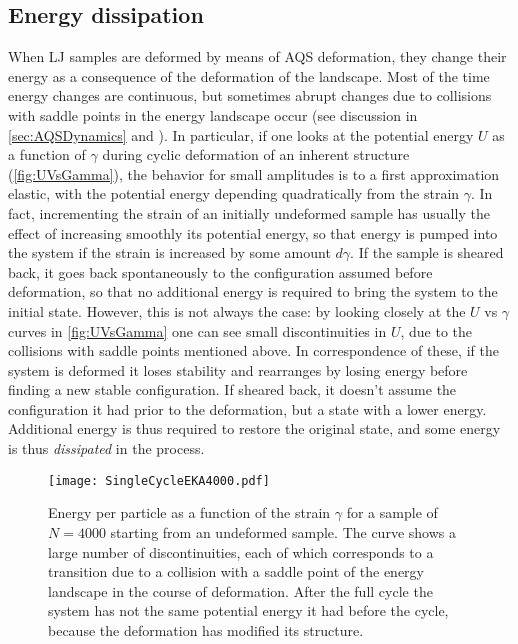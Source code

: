 \subsection{Energy dissipation\label{sec:DissipationBehavior}}

When LJ samples are deformed by means of AQS deformation, they change their energy as a consequence of the deformation of the landscape. Most of the time energy changes are continuous, but sometimes abrupt changes due to collisions with saddle points in the energy landscape occur (see discussion in \autoref{sec:AQSDynamics} and \cite{maloney2006amorphous}). In particular, if one looks at the potential energy $U$ as a function of $\gamma$ during cyclic deformation of an inherent structure (\autoref{fig:UVsGamma}), the behavior for small amplitudes is to a first approximation elastic, with the potential energy depending quadratically from the strain $\gamma$. In fact, incrementing the strain of an initially undeformed sample has usually the effect of increasing smoothly its potential energy, so that energy is pumped into the system if the strain is increased by some amount $d\gamma$. If the sample is sheared back, it goes back spontaneously to the configuration assumed before deformation, so that no additional energy is required to bring the system to the initial state.
However, this is not always the case: by looking closely at the $U$ vs $\gamma$ curves in \autoref{fig:UVsGamma} one can see small discontinuities in $U$, due to the collisions with saddle points mentioned above. In correspondence of these, if the system is deformed it loses stability and rearranges by losing energy before finding a new stable configuration. If sheared back, it doesn't assume the configuration it had prior to the deformation, but a state with a lower energy. Additional energy is thus required to restore the original state, and some energy is thus \emph{dissipated} in the process. 

\begin{figure}[!h] 
\centering 
\texttt{[image: SingleCycleEKA4000.pdf]} 
\caption{Energy per particle as a function of the strain $\gamma$ for a sample of $N=4000$ starting from an undeformed sample. The curve shows a large number of discontinuities, each of which corresponds to a transition due to a collision with a saddle point of the energy landscape in the course of deformation. After the full cycle the system has not the same potential energy it had before the cycle, because the deformation has modified its structure. \label{fig:UVsGamma}}
\end{figure}

